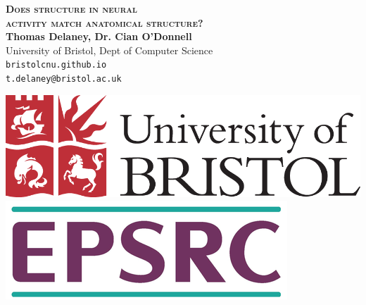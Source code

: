 \documentclass[a0,portrait]{a0poster}
\begin{document}

\begin{minipage}[b]{0.75\linewidth}
  \veryHuge \color{NavyBlue} \textbf{\textsc{Does structure in neural \\[0.3cm] activity match anatomical structure?}} \color{Black}\\[1cm] %
  \huge \textbf{Thomas Delaney, Dr. Cian O'Donnell}\\[0.3cm] %
  \huge University of Bristol, Dept of Computer Science\\[0.1cm] %
  \large \texttt{bristolcnu.github.io} \\
  \Large \texttt{t.delaney@bristol.ac.uk} \\
\end{minipage}
%
\begin{minipage}[b]{0.24\linewidth}
  \centering
  \includegraphics[width=0.9\linewidth]{bristol_university_logo.png} \vspace{0.3cm}\\
  \includegraphics[width=0.9\linewidth]{epsrc_logo.png} \vspace{2.7cm}\\
\end{minipage}
\end{document}
